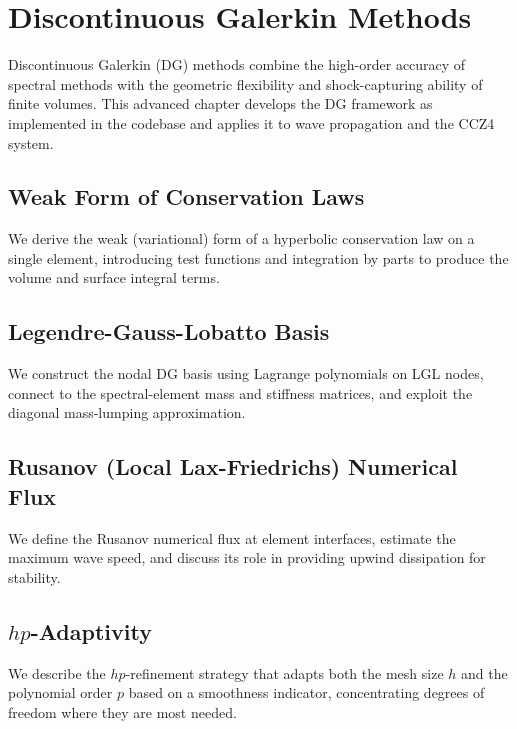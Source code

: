 \chapter{Discontinuous Galerkin Methods\starmark{}}
\label{ch:dg-methods}

Discontinuous Galerkin (DG) methods combine the high-order accuracy of spectral
methods with the geometric flexibility and shock-capturing ability of finite
volumes. This advanced chapter develops the DG framework as implemented in the
codebase and applies it to wave propagation and the CCZ4 system.

\section{Weak Form of Conservation Laws}
\label{sec:dg-weak}

We derive the weak (variational) form of a hyperbolic conservation law on a
single element, introducing test functions and integration by parts to produce
the volume and surface integral terms.

\section{Legendre-Gauss-Lobatto Basis}
\label{sec:dg-lgl}

We construct the nodal DG basis using Lagrange polynomials on LGL nodes,
connect to the spectral-element mass and stiffness matrices, and exploit
the diagonal mass-lumping approximation.

\section{Rusanov (Local Lax-Friedrichs) Numerical Flux}
\label{sec:dg-rusanov}

We define the Rusanov numerical flux at element interfaces, estimate the
maximum wave speed, and discuss its role in providing upwind dissipation
for stability.

\section{\texorpdfstring{$hp$}{hp}-Adaptivity}
\label{sec:dg-hp}

We describe the $hp$-refinement strategy that adapts both the mesh size $h$
and the polynomial order $p$ based on a smoothness indicator, concentrating
degrees of freedom where they are most needed.

